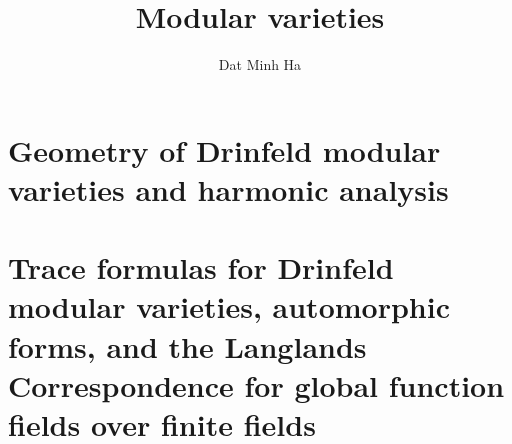 

\setcounter{section}{-1}





	\title{Modular varieties}
	
	\author{Dat Minh Ha}
	\maketitle
	
	\begin{abstract}
	    
	\end{abstract}
	
	{
      \hypersetup{} 
      \tableofcontents %
    }
    
    \part{Geometry of Drinfeld modular varieties and harmonic analysis}
        
    
    \part{Trace formulas for Drinfeld modular varieties, automorphic forms, and the Langlands Correspondence for global function fields over finite fields}
	
	\printbibliography

